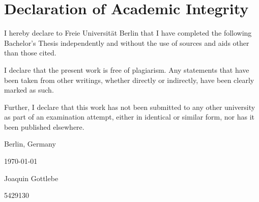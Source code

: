 \chapter*{Declaration of Academic Integrity}

I hereby declare to Freie Universität Berlin that I have completed the following
Bachelor's Thesis independently and without the use of sources and aids other than
those cited.

I declare that the present work is free of plagiarism. Any statements that have been taken from other writings, whether directly or indirectly, have been clearly marked as such.

Further, I declare that this work has not been submitted to any other university as part of an
examination attempt, either in identical or similar form, nor has it been published elsewhere.

\vfill

{
\centering

Berlin, Germany 

\today

\vspace{4em}

\underline{\hspace{6cm}}

Joaquin Gottlebe

5429130

}

\vfill